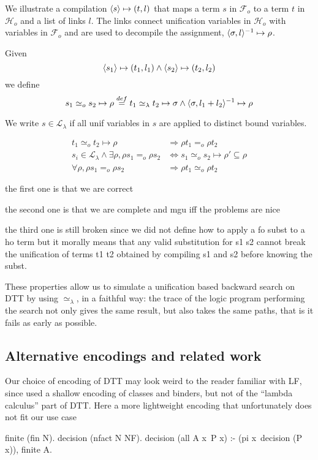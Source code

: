 \documentclass[sigconf,natbib=false]{acmart}
\newcommand{\EqualRel}{\ensuremath{=}}
\newcommand{\UnifRel}{\ensuremath{\simeq}}
\newcommand{\Uo}{\ensuremath{\UnifRel_o}\xspace}
\newcommand{\Eo}{\ensuremath{\EqualRel_o}\xspace}
\newcommand{\Ue}{\ensuremath{\UnifRel_\lambda}\xspace}
\newcommand{\Fo}{\ensuremath{\mathcal{F}_{\!o}\xspace}} %
\newcommand{\Ho}{\ensuremath{\mathcal{H}_o}\xspace}
\begin{document}
We illustrate a compilation $\langle s \rangle\mapsto(t,l)$ that
maps a term $s$ in \Fo{} to a term $t$ in \Ho and a list of links $l$.
The links connect unification variables in \Ho with variables
in \Fo{} and are used to decompile the assignment,
$\langle \sigma,l \rangle^{-1}\mapsto \rho$.

Given 
$$
\langle s_1 \rangle\mapsto(t_1,l_1) \land \langle s_2 \rangle\mapsto(t_2,l_2)
$$
we define
$$
s_1 \Uo s_2 \mapsto \rho \stackrel{def}{=}
    t_1 \Ue t_2 \mapsto \sigma \land
    \D{\sigma}{l_1 + l_2}{\rho}
$$

We write $s \in \mathcal{L}_\lambda$ if all unif variables in
$s$ are applied to distinct bound variables.

\begin{align}
t_1 \Uo t_2 \mapsto \rho &\Rightarrow \rho t_1 \Eo \rho t_2\\
s_i \in \mathcal{L}_\lambda \land \exists \rho, \rho s_1 \Eo \rho s_2 &\Leftrightarrow s_1 \Uo s_2 \mapsto \rho' \subseteq \rho \\
\forall \rho, \rho s_1 \Eo \rho s_2 &\Rightarrow \rho t_1 \Uo \rho t_2
\end{align}

the first one is that we are correct

the second one is that we are complete and mgu iff the problems are nice

the third one is still broken since we did not define how
to apply a fo subst to a ho term but it morally means
that any valid substitution for s1 s2 cannot break
the unification of terms t1 t2 obtained by compiling
s1 and s2 before knowing the subst.

These properties allow us to simulate a unification based
backward search on DTT by using \Ue, in a faithful way:
the trace of the logic program
performing the search not only gives the same result, but
also takes the same paths, that is it fails as early as possible.


\subsection{Alternative encodings and related work}


Our choice of encoding of DTT may look weird to the reader familiar with
LF, since used a shallow encoding of classes and binders, but not of the
``lambda calculus'' part of DTT. Here a more lightweight encoding
that unfortunately does not fit our use case

\begin{elpicode}
finite (fin N).
decision (nfact N NF).
decision (all A x\ P x) :- 
  (pi x\ decision (P x)), finite A.
\end{elpicode}
\end{document}
